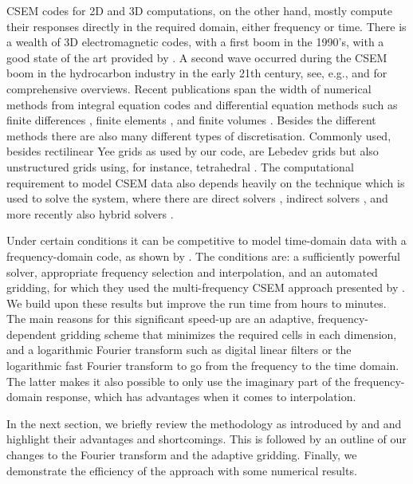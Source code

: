 \documentclass[extra, camera,%
    referee,     %
]{gji}
\begin{document}
CSEM codes for 2D and 3D computations, on the other hand, mostly compute their
responses directly in the required domain, either frequency or time. There is a
wealth of 3D electromagnetic codes, with a first boom in the 1990's, with a
good state of the art provided by \cite{B.SEG.99.Oristaglio}. A second wave
occurred during the CSEM boom in the hydrocarbon industry in the early 21th
century, see, e.g., \cite{SG.05.Avdeev} and \cite{SG.10.Borner} for
comprehensive overviews. Recent publications span the width of numerical
methods from integral equation codes \citep{MGS.17.Kruglyakov} and differential
equation methods such as finite differences \citep{CAG.13.Sommer}, finite
elements \citep{GJI.13.Grayver}, and finite volumes \citep{GEO.14.Jahandari}.
Besides the different methods there are also many different types of
discretisation. Commonly used, besides rectilinear Yee grids
\citep{IEEE.66.Yee} as used by our code, are Lebedev grids
\citep{CMMP.64.Lebedev} but also unstructured grids using, for instance,
tetrahedral \citep{CAG.17.Cai}. The computational requirement to model CSEM
data also depends heavily on the technique which is used to solve the system,
where there are direct solvers \citep{GEO.15.Grayver}, indirect solvers
\citep{GJI.15.Jaysaval}, and more recently also hybrid solvers
\citep{GEO.18.Liu}.

Under certain conditions it can be competitive to model time-domain data with a
frequency-domain code, as shown by \cite{GEO.08.Mulder}. The conditions are: a
sufficiently powerful solver, appropriate frequency selection and
interpolation, and an automated gridding, for which they used the
multi-frequency CSEM approach presented by \cite{GEO.07.Plessix}. We build upon
these results but improve the run time from hours to minutes. The main reasons
for this significant speed-up are an adaptive, frequency-dependent gridding
scheme that minimizes the required cells in each dimension, and a logarithmic
Fourier transform such as digital linear filters \citep[DLF, ][]{GP.71.Ghosh}
or the logarithmic fast Fourier transform \citep[FFTLog, ][]{RAS.00.Hamilton}
to go from the frequency to the time domain. The latter makes it also possible
to only use the imaginary part of the frequency-domain response, which has
advantages when it comes to interpolation.

In the next section, we briefly review the methodology as introduced by
\cite{GEO.07.Plessix} and \cite{GEO.08.Mulder} and highlight their advantages
and shortcomings. This is followed by an outline of our changes to the Fourier
transform and the adaptive gridding. Finally, we demonstrate the efficiency of
the approach with some numerical results.
\end{document}

